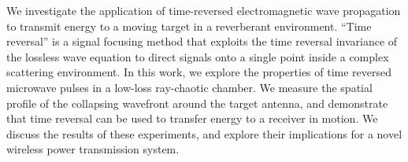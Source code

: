 % 
% 
%
We investigate the application of time-reversed
electromagnetic wave propagation to transmit energy to a moving
target in a reverberant environment. ``Time reversal'' is a signal
focusing method that exploits the time reversal invariance of the
lossless wave equation to direct signals onto a single point inside
a complex scattering environment. In this work, we explore the
properties of time reversed microwave pulses in a low-loss ray-chaotic
chamber. We measure the spatial profile of the collapsing
wavefront around the target antenna, and demonstrate that time
reversal can be used to transfer energy to a receiver in motion.
We discuss the results of these experiments, and explore their
implications for a novel wireless power transmission system.
